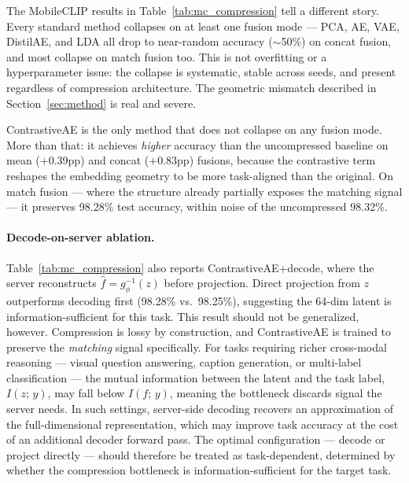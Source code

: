 \documentclass[10pt,twocolumn]{article}
\begin{document}
The MobileCLIP results in Table~\ref{tab:mc_compression} tell a different
story. Every standard method collapses on at least one fusion mode ---
PCA, AE, VAE, DistilAE, and LDA all drop to near-random accuracy ($\sim$50\%)
on concat fusion, and most collapse on match fusion too. This is not
overfitting or a hyperparameter issue: the collapse is systematic, stable
across seeds, and present regardless of compression architecture. The
geometric mismatch described in Section~\ref{sec:method} is real and severe.

ContrastiveAE is the only method that does not collapse on any fusion mode.
More than that: it achieves \emph{higher} accuracy than the uncompressed
baseline on mean ($+$0.39pp) and concat ($+$0.83pp) fusions, because the
contrastive term reshapes the embedding geometry to be more task-aligned
than the original. On match fusion --- where the structure already
partially exposes the matching signal --- it preserves 98.28\% test
accuracy, within noise of the uncompressed 98.32\%.

\paragraph{Decode-on-server ablation.}
Table~\ref{tab:mc_compression} also reports ContrastiveAE+decode, where
the server reconstructs $\hat{f} = g_\phi^{-1}(z)$ before projection.
Direct projection from $z$ outperforms decoding first (98.28\% vs.\
98.25\%), suggesting the 64-dim latent is information-sufficient for
this task. This result should not be generalized, however. Compression
is lossy by construction, and ContrastiveAE is trained to preserve the
\emph{matching} signal specifically. For tasks requiring richer
cross-modal reasoning --- visual question answering, caption generation,
or multi-label classification --- the mutual information between the
latent and the task label, $I(z;\,y)$, may fall below $I(f;\,y)$,
meaning the bottleneck discards signal the server needs. In such
settings, server-side decoding recovers an approximation of the
full-dimensional representation, which may improve task accuracy at
the cost of an additional decoder forward pass. The optimal
configuration --- decode or project directly --- should therefore be
treated as task-dependent, determined by whether the compression
bottleneck is information-sufficient for the target task.
\end{document}
